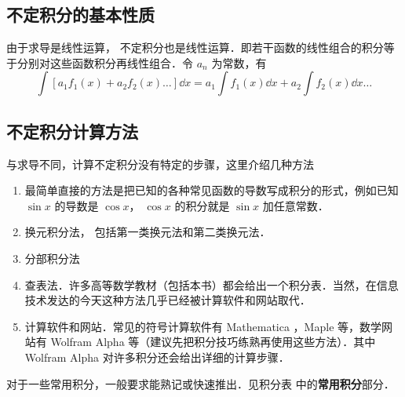 \subsection{不定积分的基本性质}%

由于求导是线性运算，%
不定积分也是线性运算．即若干函数的线性组合的积分等于分别对这些函数积分再线性组合．令 $a_n$ 为常数，有
\begin{equation}\label{Int_eq4}
\int [a_1 f_1(x) + a_2 f_2(x)\dots] \dd{x}  = a_1 \int f_1(x) \dd{x} + a_2 \int f_2(x) \dd{x} \dots
\end{equation}

\subsection{不定积分计算方法}
与求导不同，计算不定积分没有特定的步骤，这里介绍几种方法
\begin{enumerate}
\item 最简单直接的方法是把已知的各种常见函数的导数写成积分的形式，例如已知 $\sin x$ 的导数是 $\cos x$， $\cos x$ 的积分就是 $\sin x$ 加任意常数．
\item 换元积分法， 包括第一类换元法和第二类换元法．

\item 分部积分法

\item 查表法．许多高等数学教材（包括本书）都会给出一个积分表．当然，在信息技术发达的今天这种方法几乎已经被计算软件和网站取代．

\item 计算软件和网站．常见的符号计算软件有 Mathematica %
，Maple 等，数学网站有 Wolfram Alpha %
等（建议先把积分技巧练熟再使用这些方法）．其中 Wolfram Alpha 对许多积分还会给出详细的计算步骤．
 \end{enumerate}

对于一些常用积分，一般要求能熟记或快速推出．见积分表 中的\textbf{常用积分}部分．%



